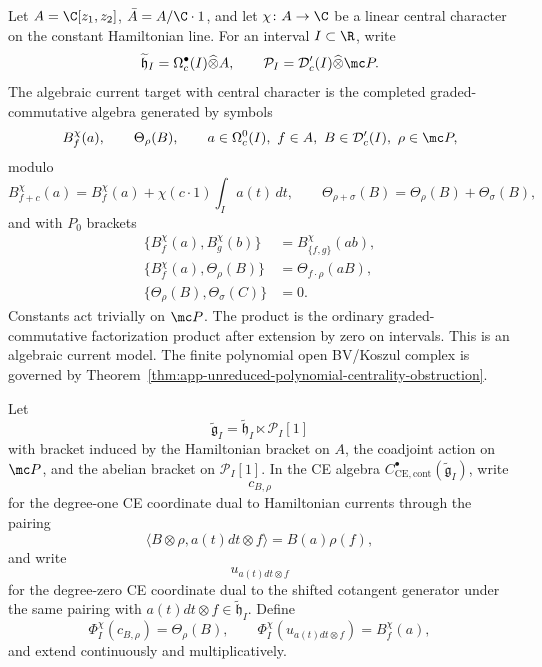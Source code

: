 \begin{defn}
\label{def:app-central-character-principal-part-current-algebra}
  Let \(A=\C[z_1,z_2]\), \(\bar A=A/\C\cdot1\), and let
  \(\chi\colon A\to\C\) be a linear central character on the constant
  Hamiltonian line.  For an interval \(I\subset\R\), write
  \[
    \widetilde{\mathfrak h}_I=\Omega^\bullet_c(I)\widehat\otimes A,
    \qquad
    \mathcal P_I=\mathcal D'_c(I)\widehat\otimes\mc P .
  \]
  The algebraic current target with central character is the completed
  graded-commutative algebra generated by symbols
  \[
    B_f^\chi(a),\qquad \Theta_\rho(B),
    \qquad
    a\in\Omega^0_c(I),\ f\in A,\ B\in\mathcal D'_c(I),\
    \rho\in\mc P,
  \]
  modulo
  \[
    B_{f+c}^\chi(a)=B_f^\chi(a)+\chi(c\cdot1)\int_Ia(t)\,dt,\qquad
    \Theta_{\rho+\sigma}(B)=\Theta_\rho(B)+\Theta_\sigma(B),
  \]
  and with \(P_0\) brackets
  \[
  \begin{aligned}
    \{B_f^\chi(a),B_g^\chi(b)\}
      &=B_{\{f,g\}}^\chi(ab),\\
    \{B_f^\chi(a),\Theta_\rho(B)\}
      &=\Theta_{f\cdot\rho}(aB),\\
    \{\Theta_\rho(B),\Theta_\sigma(C)\}&=0 .
  \end{aligned}
  \]
  Constants act trivially on \(\mc P\).  The product is the ordinary
  graded-commutative factorization product after extension by zero on
  intervals.  This is an algebraic current model.  The finite polynomial
  open BV/Koszul complex is governed by
  Theorem~\ref{thm:app-unreduced-polynomial-centrality-obstruction}.
\end{defn}

\begin{constr}
\label{constr:app-algebraic-factorization-centre-lift}
  Let
  \[
    \widetilde{\mathfrak g}_I
      =\widetilde{\mathfrak h}_I\ltimes\mathcal P_I[1]
  \]
  with bracket induced by the Hamiltonian bracket on \(A\), the
  coadjoint action on \(\mc P\), and the abelian bracket on
  \(\mathcal P_I[1]\).  In the CE algebra
  \(C^\bullet_{\mathrm{CE},\mathrm{cont}}(\widetilde{\mathfrak g}_I)\),
  write
  \[
    c_{B,\rho}
  \]
  for the degree-one CE coordinate dual to Hamiltonian currents through
  the pairing
  \[
    \langle B\otimes\rho,a(t)dt\otimes f\rangle
      =B(a)\rho(f),
  \]
  and write
  \[
    u_{a(t)dt\otimes f}
  \]
  for the degree-zero CE coordinate dual to the shifted cotangent
  generator under the same pairing with
  \(a(t)dt\otimes f\in\widetilde{\mathfrak h}_I\).
  Define
  \[
    \Phi_I^\chi(c_{B,\rho})=\Theta_\rho(B),\qquad
    \Phi_I^\chi(u_{a(t)dt\otimes f})=B_f^\chi(a),
  \]
  and extend continuously and multiplicatively.
\end{constr}

